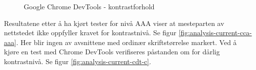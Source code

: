 \begin{figure}[H]
    \begin{center}
        \caption{Google Chrome DevTools - kontrastforhold}
        \label{fig:analysis-current-cdt}
    \end{center}
\end{figure}

Resultatene etter å ha kjørt tester for nivå AAA viser at mesteparten av nettstedet ikke oppfyller kravet for kontrastnivå. Se figur \ref{fig:analysis-current-cca-aaa}. Her blir ingen av avsnittene med ordinær skriftstørrelse markert. Ved å kjøre en test med Chrome DevTools verifiseres påstanden om for dårlig kontrastnivå. Se figur \ref{fig:analysis-current-cdt-c}.

